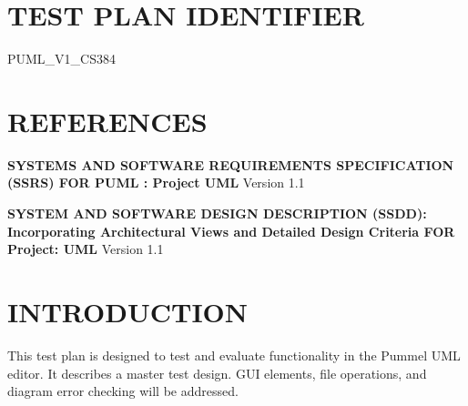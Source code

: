 \documentclass[twoside,letterpaper]{article}
\begin{document}
\bigskip

\bigskip

\setcounter{page}{1}\pagestyle{Convertiv}

\section[IDENTIFIER]{\bfseries\color{black}
TEST PLAN IDENTIFIER}
{\color{black}
PUML\_V1\_CS384
}


\section[REFERENCES]{\bfseries\color{black}
REFERENCES}
{\color{black}
\begin{list}{-}{ }
\item \textbf{SYSTEMS AND SOFTWARE REQUIREMENTS SPECIFICATION (SSRS) FOR
PUML : Project UML} Version 1.1
\item \textbf{SYSTEM AND SOFTWARE DESIGN DESCRIPTION (SSDD): Incorporating
Architectural Views and Detailed Design Criteria FOR Project: UML} Version 1.1
\end{list}
}

\section[INTRODUCTION]{\bfseries\color{black} INTRODUCTION}
{\color{black}
This test plan is designed to test and evaluate functionality in the Pummel UML editor. It describes a master test design. GUI elements, file operations, and diagram error checking will be addressed.
}
\end{document}
